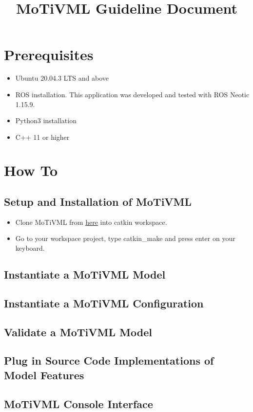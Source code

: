 \documentclass{article}
\title{MoTiVML Guideline Document}
\date{}
\begin{document}
\maketitle

\label{guide:docs}
\section{Prerequisites}
    \begin{itemize}
        \item Ubuntu 20.04.3 LTS and above
        \item ROS installation. This application was developed and tested with ROS Neotic 1.15.9.
        \item Python3 installation
        \item C++ 11 or higher
    \end{itemize}

\section{How To}
\subsection{Setup and Installation of MoTiVML}
\begin{itemize}
    \item Clone MoTiVML from \href{https://github.com/SergioGarG/sera-extension}{here} into catkin workspace.
    \item Go to your workspace project, type catkin\_make and press enter on your keyboard.
\end{itemize}

\subsection{Instantiate a MoTiVML Model}
\subsection{Instantiate a MoTiVML Configuration}
\subsection{Validate a MoTiVML Model}
\subsection{Plug in Source Code Implementations of Model Features}
\subsection{MoTiVML Console Interface}
\end{document}
